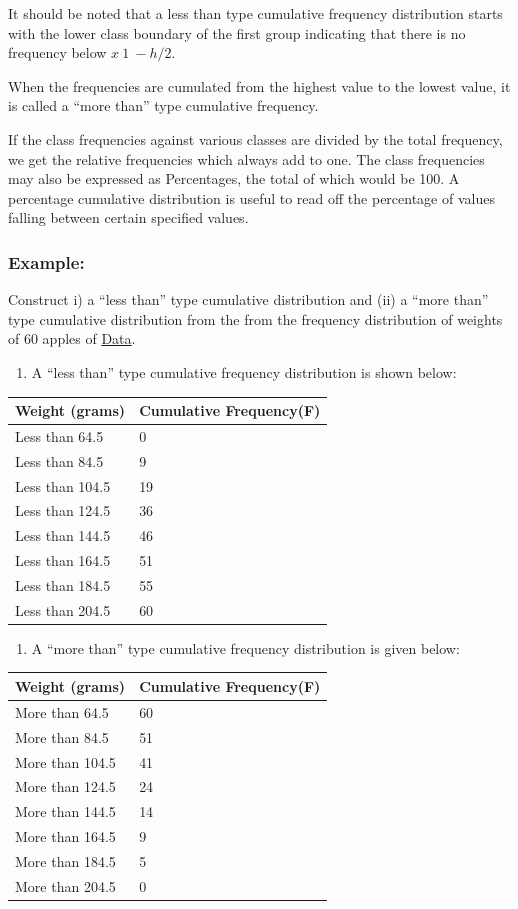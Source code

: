 \documentclass[]{article}
\providecommand{\tightlist}{%
  \setlength{\itemsep}{0pt}\setlength{\parskip}{0pt}}
\begin{document}
It should be noted that a less than type cumulative frequency
distribution starts with the lower class boundary of the first group
indicating that there is no frequency below \(x~1~ - h/2\).

When the frequencies are cumulated from the highest value to the lowest
value, it is called a ``more than'' type cumulative frequency.

If the class frequencies against various classes are divided by the
total frequency, we get the relative frequencies which always add to
one. The class frequencies may also be expressed as Percentages, the
total of which would be 100. A percentage cumulative distribution is
useful to read off the percentage of values falling between certain
specified values.

\hypertarget{example-1}{%
\subsubsection{Example:}\label{example-1}}

Construct i) a ``less than'' type cumulative distribution and (ii) a
``more than'' type cumulative distribution from the from the frequency
distribution of weights of 60 apples of \protect\hyperlink{data}{Data}.

\begin{enumerate}
\def\labelenumi{\roman{enumi})}
\tightlist
\item
  A ``less than'' type cumulative frequency distribution is shown below:
\end{enumerate}

\begin{longtable}[]{@{}ll@{}}
\toprule
Weight (grams) & Cumulative Frequency(F)\tabularnewline
\midrule
\endhead
Less than 64.5 & 0\tabularnewline
Less than 84.5 & 9\tabularnewline
Less than 104.5 & 19\tabularnewline
Less than 124.5 & 36\tabularnewline
Less than 144.5 & 46\tabularnewline
Less than 164.5 & 51\tabularnewline
Less than 184.5 & 55\tabularnewline
Less than 204.5 & 60\tabularnewline
\bottomrule
\end{longtable}

\begin{enumerate}
\def\labelenumi{\roman{enumi})}
\setcounter{enumi}{1}
\tightlist
\item
  A ``more than'' type cumulative frequency distribution is given below:
\end{enumerate}

\begin{longtable}[]{@{}ll@{}}
\toprule
Weight (grams) & Cumulative Frequency(F)\tabularnewline
\midrule
\endhead
More than 64.5 & 60\tabularnewline
More than 84.5 & 51\tabularnewline
More than 104.5 & 41\tabularnewline
More than 124.5 & 24\tabularnewline
More than 144.5 & 14\tabularnewline
More than 164.5 & 9\tabularnewline
More than 184.5 & 5\tabularnewline
More than 204.5 & 0\tabularnewline
\bottomrule
\end{longtable}
\end{document}
